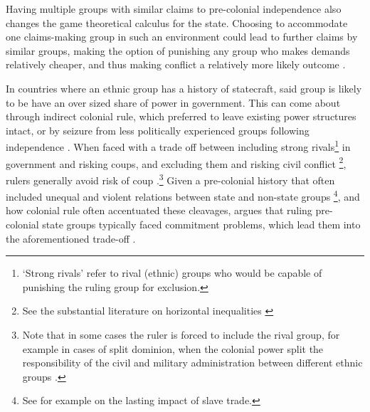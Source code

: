 \documentclass[12pt]{article}
\begin{document}
Having multiple groups with similar claims to pre-colonial independence also
changes the game theoretical calculus for the state. Choosing to accommodate one
claims-making group in such an environment could lead to further claims by
similar groups, making the option of punishing any group who makes demands
relatively cheaper, and thus making conflict a relatively more likely outcome
\citep{Wishman}.

In countries where an ethnic group has a history of statecraft, said group is
likely to be have an over sized share of power in government. This can come
about through indirect colonial rule, which preferred to leave existing power
structures intact, or by seizure from less politically experienced groups
following independence \citep{Paine2019}. When faced with a trade off between
including strong rivals\footnote{`Strong rivals' refer to rival (ethnic) groups
who would be capable of punishing the ruling group for exclusion.} in government
and risking coups, and excluding them and risking civil conflict \footnote{See
the substantial literature on horizontal inequalities \citep{CEDERMAN_2011}},
rulers generally avoid risk of coup \citep{Paine2019, Powell_2014,
	Roessler_2011}.\footnote{Note that in some cases the ruler is forced to
	include the rival group, for example in cases of split dominion, when
	the colonial power split the responsibility of the civil and military
	administration between different ethnic groups \citep{Paine2019}.} Given
	a pre-colonial history that often included unequal and violent relations
	between state and non-state groups \footnote{See for example
		\citet{Nunn2008} on the lasting impact of slave trade.}, and how
		colonial rule often accentuated these cleavages,
		\citet{Paine2019} argues that ruling pre-colonial state groups
		typically faced commitment problems, which lead them into the
		aforementioned trade-off \citep{Paine2019}.
\end{document}
